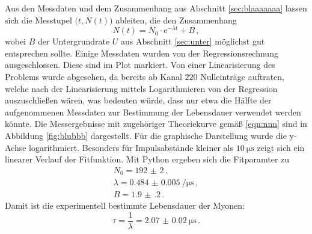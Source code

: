 Aus den Messdaten und dem Zusammenhang aus Abschnitt \ref{sec:blaaaaaaa} lassen sich die
Messtupel $\big(t, N(t)\big)$ ableiten, die den Zusammenhang
\begin{equation}
	\label{eqn:nnn}
	N(t) = N_0 \cdot \mathrm{e}^{-\lambda t} + B \, \mathrm{,}
\end{equation}
wobei $B$ der Untergrundrate $U$ aus Abschnitt \ref{sec:unter} möglichst gut entsprechen sollte.
Einige Messdaten wurden von der Regressionsrechnung ausgeschlossen. Diese sind im Plot markiert.
Von einer Linearisierung des Problems wurde abgesehen, da bereits ab Kanal $220$ Nulleinträge auftraten, welche nach der Linearisierung mittels Logarithmieren von der Regression auszuschließen wären, was bedeuten würde, dass nur etwa die Hälfte der aufgenommenen Messdaten zur Bestimmung der Lebensdauer verwendet werden könnte.
Die Messergebnisse mit zugehöriger Theoriekurve gemäß \eqref{eqn:nnn} sind in Abbildung
\ref{fig:blubbb} dargestellt.
Für die graphische Darstellung wurde die y-Achse logarithmiert. Besonders für Impulsabstände kleiner als $\SI{10}{\micro\second}$ zeigt sich ein linearer Verlauf der Fitfunktion.
Mit Python \cite{numpy} ergeben sich die Fitparamter zu
\begin{align*}
	N_0 = \num{192(2)}\, \mathrm{,} \\
	\lambda = \SI{0.484(5)}{\per\micro\second} \, \mathrm{,}\\
	B=\num{1.9(2)}\,\text{.}
\end{align*}
Damit ist die experimentell bestimmte Lebensdauer der Myonen:
\begin{equation*}
	\tau = \frac{1}{\lambda} = \SI{2.07(2)}{\micro\second} \, \mathrm{.}
\end{equation*}
